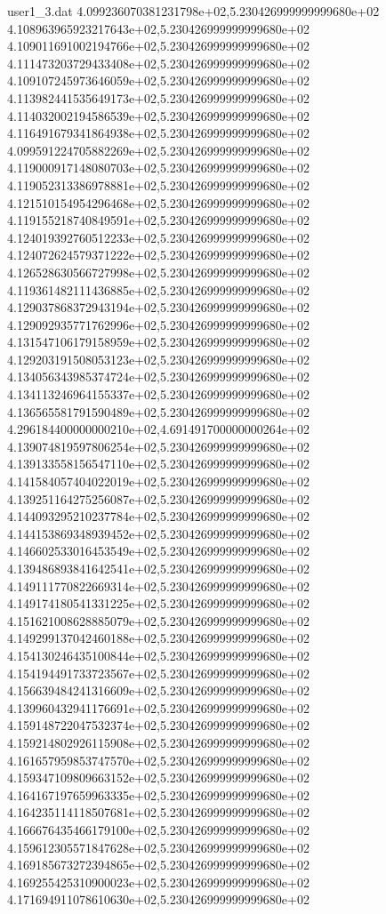 \begin{filecontents}{user1_3.dat}
4.099236070381231798e+02,5.230426999999999680e+02
4.108963965923217643e+02,5.230426999999999680e+02
4.109011691002194766e+02,5.230426999999999680e+02
4.111473203729433408e+02,5.230426999999999680e+02
4.109107245973646059e+02,5.230426999999999680e+02
4.113982441535649173e+02,5.230426999999999680e+02
4.114032002194586539e+02,5.230426999999999680e+02
4.116491679341864938e+02,5.230426999999999680e+02
4.099591224705882269e+02,5.230426999999999680e+02
4.119000917148080703e+02,5.230426999999999680e+02
4.119052313386978881e+02,5.230426999999999680e+02
4.121510154954296468e+02,5.230426999999999680e+02
4.119155218740849591e+02,5.230426999999999680e+02
4.124019392760512233e+02,5.230426999999999680e+02
4.124072624579371222e+02,5.230426999999999680e+02
4.126528630566727998e+02,5.230426999999999680e+02
4.119361482111436885e+02,5.230426999999999680e+02
4.129037868372943194e+02,5.230426999999999680e+02
4.129092935771762996e+02,5.230426999999999680e+02
4.131547106179158959e+02,5.230426999999999680e+02
4.129203191508053123e+02,5.230426999999999680e+02
4.134056343985374724e+02,5.230426999999999680e+02
4.134113246964155337e+02,5.230426999999999680e+02
4.136565581791590489e+02,5.230426999999999680e+02
4.296184400000000210e+02,4.691491700000000264e+02
4.139074819597806254e+02,5.230426999999999680e+02
4.139133558156547110e+02,5.230426999999999680e+02
4.141584057404022019e+02,5.230426999999999680e+02
4.139251164275256087e+02,5.230426999999999680e+02
4.144093295210237784e+02,5.230426999999999680e+02
4.144153869348939452e+02,5.230426999999999680e+02
4.146602533016453549e+02,5.230426999999999680e+02
4.139486893841642541e+02,5.230426999999999680e+02
4.149111770822669314e+02,5.230426999999999680e+02
4.149174180541331225e+02,5.230426999999999680e+02
4.151621008628885079e+02,5.230426999999999680e+02
4.149299137042460188e+02,5.230426999999999680e+02
4.154130246435100844e+02,5.230426999999999680e+02
4.154194491733723567e+02,5.230426999999999680e+02
4.156639484241316609e+02,5.230426999999999680e+02
4.139960432941176691e+02,5.230426999999999680e+02
4.159148722047532374e+02,5.230426999999999680e+02
4.159214802926115908e+02,5.230426999999999680e+02
4.161657959853747570e+02,5.230426999999999680e+02
4.159347109809663152e+02,5.230426999999999680e+02
4.164167197659963335e+02,5.230426999999999680e+02
4.164235114118507681e+02,5.230426999999999680e+02
4.166676435466179100e+02,5.230426999999999680e+02
4.159612305571847628e+02,5.230426999999999680e+02
4.169185673272394865e+02,5.230426999999999680e+02
4.169255425310900023e+02,5.230426999999999680e+02
4.171694911078610630e+02,5.230426999999999680e+02

\end{filecontents}
